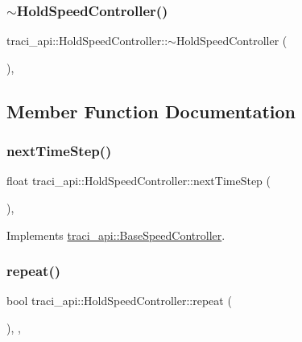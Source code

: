 \subsubsection{\texorpdfstring{$\sim$\+Hold\+Speed\+Controller()}{~HoldSpeedController()}}
{\footnotesize\ttfamily traci\+\_\+api\+::\+Hold\+Speed\+Controller\+::$\sim$\+Hold\+Speed\+Controller (\begin{DoxyParamCaption}{ }\end{DoxyParamCaption})\hspace{0.3cm}{\ttfamily [inline]}, {\ttfamily [override]}}



\subsection{Member Function Documentation}
\mbox{\label{classtraci__api_1_1_hold_speed_controller_a61476bf22b8252d2a0badd2214b7357a}} 
\subsubsection{\texorpdfstring{next\+Time\+Step()}{nextTimeStep()}}
{\footnotesize\ttfamily float traci\+\_\+api\+::\+Hold\+Speed\+Controller\+::next\+Time\+Step (\begin{DoxyParamCaption}{ }\end{DoxyParamCaption})\hspace{0.3cm}{\ttfamily [override]}, {\ttfamily [virtual]}}



Implements \hyperlink{classtraci__api_1_1_base_speed_controller_ab9658ce36f91de8a34bb710b3241c210}{traci\+\_\+api\+::\+Base\+Speed\+Controller}.

\mbox{\label{classtraci__api_1_1_hold_speed_controller_acf2f2b8595dd8a135b13be736ee29d63}} 
\subsubsection{\texorpdfstring{repeat()}{repeat()}}
{\footnotesize\ttfamily bool traci\+\_\+api\+::\+Hold\+Speed\+Controller\+::repeat (\begin{DoxyParamCaption}{ }\end{DoxyParamCaption})\hspace{0.3cm}{\ttfamily [inline]}, {\ttfamily [override]}, {\ttfamily [virtual]}}



